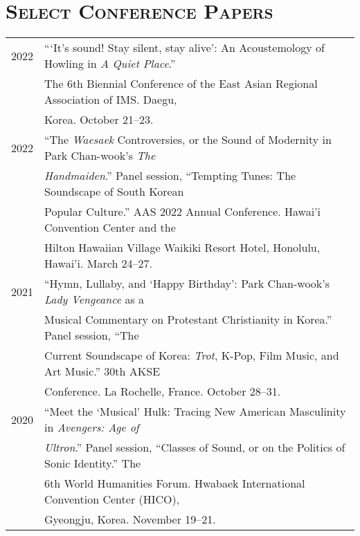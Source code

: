 \documentclass[a4paper,11pt,draft]{article}
\begin{document}
  \vspace{5.0mm}
  
  \section*{\textsc{Select Conference Papers}}
  
  \hspace*{-0.25cm}
  \begin{tabular}{p{2.5cm} p{12.5cm}}
    2022 & “‘It’s sound! Stay silent, stay alive’: An Acoustemology of Howling in \textit{A Quiet Place}.”\\
    & The 6th Biennial Conference of the East Asian Regional Association of IMS. Daegu,\\
    & Korea. October 21–23.\\[2mm]
    
    2022 & “The \textit{Waesaek} Controversies, or the Sound of Modernity in Park Chan-wook’s \textit{The}\\
    & \textit{Handmaiden}.” Panel session, “Tempting Tunes: The Soundscape of South Korean\\
    & Popular Culture.” AAS 2022 Annual Conference. Hawai'i Convention Center and the\\
    & Hilton Hawaiian Village Waikiki Resort Hotel, Honolulu, Hawai'i. March 24–27.\\[2mm]
    
    2021 & “Hymn, Lullaby, and ‘Happy Birthday’: Park Chan-wook’s \textit{Lady Vengeance} as a\\
    & Musical Commentary on Protestant Christianity in Korea.” Panel session, “The\\
    & Current Soundscape of Korea: \textit{Trot}, K-Pop, Film Music, and Art Music.” 30th AKSE\\
    & Conference. La Rochelle, France. October 28–31.\\[2mm]

  
    2020 & “Meet the ‘Musical’ Hulk: Tracing New American Masculinity in \textit{Avengers: Age of}\\
    & \textit{Ultron}.” Panel session, “Classes of Sound, or on the Politics of Sonic Identity.” The\\
    & 6th World Humanities Forum. Hwabaek International Convention Center (HICO),\\
    & Gyeongju, Korea. November 19–21.\\[2mm]


\end{tabular}
\end{document}
